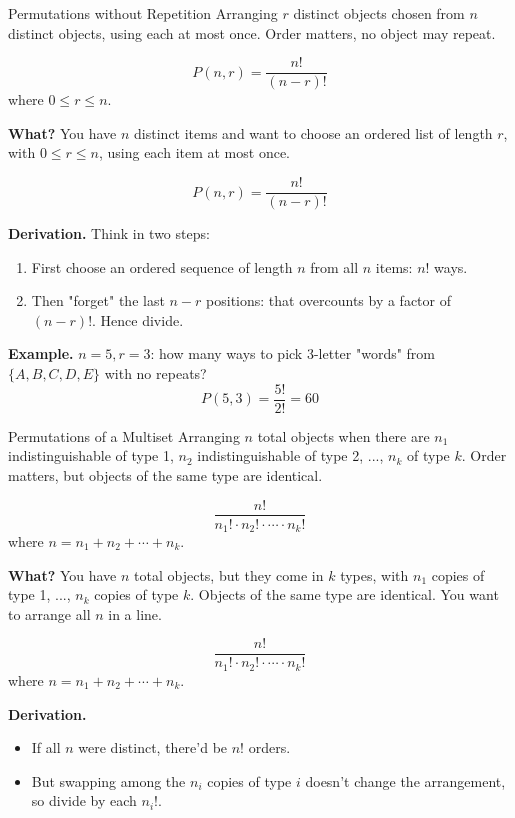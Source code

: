 

\begin{define}{Permutations without Repetition}
Arranging $r$ distinct objects chosen from $n$ distinct objects, using each at most once. 
Order matters, no object may repeat.

$$P(n,r) = \frac{n!}{(n - r)!}$$
where $0 \leq r \leq n$.
\end{define}

\textbf{What?} You have $n$ distinct items and want to choose an ordered 
list of length $r$, with $0 \leq r \leq n$, using each item at most once.

$$P(n,r) = \frac{n!}{(n - r)!}$$

\textbf{Derivation.} Think in two steps:
\begin{enumerate}
\item First choose an ordered sequence of length $n$ from all $n$ items: $n!$ ways.
\item Then "forget" the last $n-r$ positions: that overcounts by a factor of $(n - r)!$. 
Hence divide.
\end{enumerate}

\textbf{Example.} $n=5,r=3$: how many ways to pick 3-letter "words" from 
$\{A,B,C,D,E\}$ with no repeats?
$$P(5,3)=\frac{5!}{2!}=60$$

\newpage

\begin{define}{Permutations of a Multiset}
Arranging $n$ total objects when there are $n_1$ indistinguishable of type 1, 
$n_2$ indistinguishable of type 2, ..., $n_k$ of type $k$. Order matters, 
but objects of the same type are identical.

$$\frac{n!}{n_1! \cdot n_2! \cdot \cdots \cdot n_k!}$$
where $n = n_1 + n_2 + \cdots + n_k$.
\end{define}

\textbf{What?} You have $n$ total objects, but they come in $k$ types, 
with $n_1$ copies of type 1, ..., $n_k$ copies of type $k$. Objects of 
the same type are identical. You want to arrange all $n$ in a line.

$$\frac{n!}{n_1! \cdot n_2! \cdot \cdots \cdot n_k!}$$
where $n = n_1 + n_2 + \cdots + n_k$.

\textbf{Derivation.}
\begin{itemize}
\item If all $n$ were distinct, there'd be $n!$ orders.
\item But swapping among the $n_i$ copies of type $i$ doesn't change the 
arrangement, so divide by each $n_i!$.
\end{itemize}


